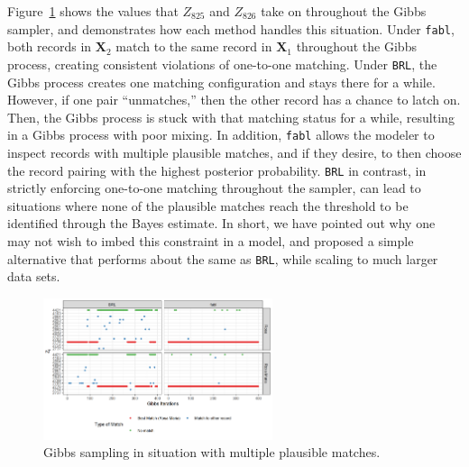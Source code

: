 \documentclass[12pt,letterpaper]{article}
\newcommand{\1}[1]{\mathbb{I}\!\left[#1\right]} %
\begin{document}
Figure~\ref{fig:mixing-plot} shows the values that \(Z_{825}\) and \(Z_{826}\) take on
throughout the Gibbs sampler, and demonstrates how each method handles
this situation. Under \texttt{fabl}, both records in \(\bm{X}_2\) match to the
same record in \(\bm{X}_1\) throughout the Gibbs process, creating consistent
violations of one-to-one matching. Under \texttt{BRL}, the Gibbs process
creates one matching configuration and stays there for a while. However, if
one pair ``unmatches,'' then the other record has a chance to latch on.
Then, the Gibbs process is stuck with that matching status for a while,
resulting in a Gibbs process with poor mixing. In addition,
\texttt{fabl} allows the modeler to inspect records with multiple
plausible matches, and if they desire, to then choose the record pairing
with the highest posterior probability. \texttt{BRL} in contrast, in
strictly enforcing one-to-one matching throughout the sampler, can lead
to situations where none of the plausible matches reach the threshold to
be identified through the Bayes estimate. In short, we have pointed out why one may not wish to imbed this constraint in a model, and proposed a simple alternative that performs about the same as \texttt{BRL}, while scaling to much larger data sets. 

\begin{figure}[h!]
\begin{center}
\includegraphics[width=0.6\textwidth]{../notes/figures/el_salvador/bad_mixing} 
\caption{Gibbs sampling in situation with multiple plausible matches.}\label{fig:mixing-plot}
\end{center}
\end{figure}


%	
%		
%	
\end{document}
